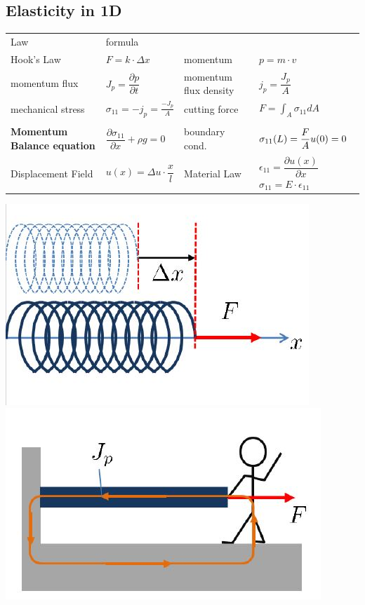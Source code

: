 \subsection{Elasticity in 1D}
\renewcommand{\arraystretch}{2}
	\begin{tabularx}{ \columnwidth} {lXXX}
		Law & formula &&\\
		Hook's Law & $F = k\cdot \Delta x$ &
		momentum   & $p = m\cdot v$\\
		
		momentum flux & $J_p = \dfrac{\partial p}{\partial t}$&
		momentum flux density & $j_p = \dfrac{J_p}{A}$\\
		
		mechanical stress & $\sigma_{11} = -j_p = \frac{-J_p}{A} $ &
		cutting force & $F = \int_A \sigma_{11} dA$\\
		&&&\\
		
		\textbf{Momentum Balance equation} & $\dfrac{\partial \sigma_{11}}{\partial x} + \rho g= 0$ &
		boundary cond. & $\sigma_{11}(L) = \dfrac{F}{A} \newline u(0) = 0$\\
		
		Displacement Field & $u(x) = \Delta u \cdot \dfrac{x}{l}$ & 
		Material Law & $\epsilon_{11} = \dfrac{\partial u(x)}{\partial x} $\newline $ \sigma_{11} = E\cdot \epsilon_{11}$\\ 
		
	\end{tabularx}
\renewcommand{\arraystretch}{1.2}	
	 \includegraphics[scale = 0.3]{images/hook}
		\includegraphics[scale=.3]{images/momentcons}
